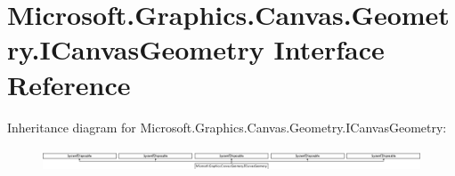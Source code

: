\hypertarget{interface_microsoft_1_1_graphics_1_1_canvas_1_1_geometry_1_1_i_canvas_geometry}{}\section{Microsoft.\+Graphics.\+Canvas.\+Geometry.\+I\+Canvas\+Geometry Interface Reference}
\label{interface_microsoft_1_1_graphics_1_1_canvas_1_1_geometry_1_1_i_canvas_geometry}
Inheritance diagram for Microsoft.\+Graphics.\+Canvas.\+Geometry.\+I\+Canvas\+Geometry\+:\begin{figure}[H]
\begin{center}
\leavevmode
\includegraphics[height=0.664688cm]{interface_microsoft_1_1_graphics_1_1_canvas_1_1_geometry_1_1_i_canvas_geometry}
\end{center}
\end{figure}
